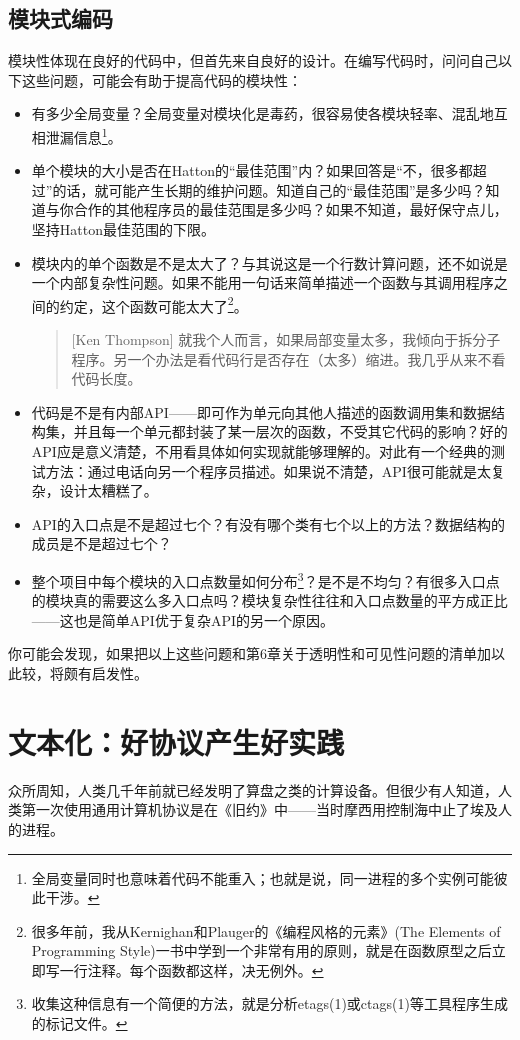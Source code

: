 \documentclass[12pt,oneside]{book}
\begin{document}
\begin{common-format}
\section{模块式编码}
模块性体现在良好的代码中，但首先来自良好的设计。在编写代码时，问问自己以下这些问题，可能会有助于提高代码的模块性：
\begin{itemize}
\item 有多少全局变量？全局变量对模块化是毒药，很容易使各模块轻率、混乱地互相泄漏信息\footnote{全局变量同时也意味着代码不能重入；也就是说，同一进程的多个实例可能彼此干涉。}。
\item 单个模块的大小是否在Hatton的“最佳范围”内？如果回答是“不，很多都超过”的话，就可能产生长期的维护问题。知道自己的“最佳范围”是多少吗？知道与你合作的其他程序员的最佳范围是多少吗？如果不知道，最好保守点儿，坚持Hatton最佳范围的下限。
\item 模块内的单个函数是不是太大了？与其说这是一个行数计算问题，还不如说是一个内部复杂性问题。如果不能用一句话来简单描述一个函数与其调用程序之间的约定，这个函数可能太大了\footnote{很多年前，我从Kernighan和Plauger的《编程风格的元素》(The Elements of Programming Style)一书中学到一个非常有用的原则，就是在函数原型之后立即写一行注释。每个函数都这样，决无例外。}。
\begin{quote}[Ken Thompson]
就我个人而言，如果局部变量太多，我倾向于拆分子程序。另一个办法是看代码行是否存在（太多）缩进。我几乎从来不看代码长度。
\end{quote}
\item 代码是不是有内部API——即可作为单元向其他人描述的函数调用集和数据结构集，并且每一个单元都封装了某一层次的函数，不受其它代码的影响？好的API应是意义清楚，不用看具体如何实现就能够理解的。对此有一个经典的测试方法：通过电话向另一个程序员描述。如果说不清楚，API很可能就是太复杂，设计太糟糕了。
\item API的入口点是不是超过七个？有没有哪个类有七个以上的方法？数据结构的成员是不是超过七个？
\item 整个项目中每个模块的入口点数量如何分布\footnote{收集这种信息有一个简便的方法，就是分析etags(1)或ctags(1)等工具程序生成的标记文件。}？是不是不均匀？有很多入口点的模块真的需要这么多入口点吗？模块复杂性往往和入口点数量的平方成正比——这也是简单API优于复杂API的另一个原因。
\end{itemize}

你可能会发现，如果把以上这些问题和第6章关于透明性和可见性问题的清单加以此较，将颇有启发性。



\chapter{文本化：好协议产生好实践}
\begin{flushright}
\begin{notecard}{27em}
 众所周知，人类几千年前就已经发明了算盘之类的计算设备。但很少有人知道，人类第一次使用通用计算机协议是在《旧约》中——当时摩西用控制海中止了埃及人的进程。
 

\end{notecard}
\end{flushright}
\end{common-format}
\end{document}

